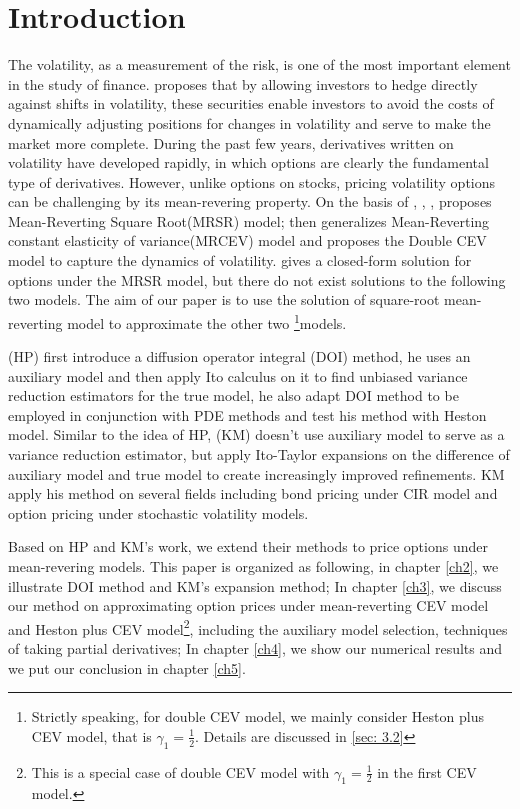 \chapter{Introduction}

The volatility, as a measurement of the risk, is one of the most important element in the study of finance. \cite{whaley_derivatives_1993} proposes that by allowing investors to hedge directly against shifts in volatility, these securities enable investors to avoid the costs of dynamically adjusting positions for changes in volatility and serve to make the market more complete. During the past few years, derivatives written on volatility have developed rapidly, in which options are clearly the fundamental type of derivatives. However, unlike options on stocks, pricing volatility options can be challenging by its mean-revering property. On the basis of \cite{cox_theory_1985}, \cite{hull_pricing_1987}, \cite{heston_closed-form_1993}, \cite{grunbichler_valuing_1996} proposes Mean-Reverting Square Root(MRSR) model; \cite{chan_empirical_1992} then generalizes Mean-Reverting constant elasticity of variance(MRCEV) model and \cite{gatheral_consistent_2008} proposes the Double CEV model to capture the dynamics of volatility. \cite{grunbichler_valuing_1996} gives a closed-form solution for options under the MRSR model, but there do not exist solutions to the following two models. The aim of our paper is to use the solution of square-root mean-reverting model to approximate the other two \footnote{Strictly speaking, for double CEV model, we mainly consider Heston plus CEV model, that is $\gamma_1=\frac{1}{2}$. Details are discussed in \ref{sec: 3.2}}{models}.

\cite{heath_variance_2002}(HP) first introduce a diffusion operator integral (DOI) method, he uses an auxiliary model and then apply Ito calculus on it to find unbiased variance reduction estimators for the true model, he also adapt DOI method to be employed in conjunction with PDE methods and test his method with Heston model. Similar to the idea of HP, \cite{kristensen_adding_2011}(KM) doesn't use auxiliary model to serve as a variance reduction estimator, but apply Ito-Taylor expansions on the difference of auxiliary model and true model to  create increasingly improved refinements. KM apply his method on several fields including bond pricing under CIR model and option pricing under stochastic volatility models.

Based on HP and KM's work, we extend their methods to price options under mean-revering models. This paper is organized as following, in chapter \ref{ch2}, we illustrate DOI method and KM's expansion method; In chapter \ref{ch3}, we discuss our method on approximating option prices under mean-reverting CEV model and {Heston plus CEV model}\footnote{This is a special case of double CEV model with $\gamma_1=\frac{1}{2}$ in the first CEV model.}, including the auxiliary model selection, techniques of taking partial derivatives; In chapter \ref{ch4}, we show our numerical results and we put our conclusion in chapter \ref{ch5}.